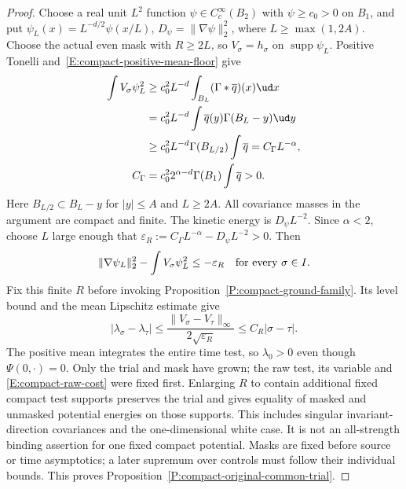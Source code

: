 \begin{proof}
  Choose a real unit $L^2$ function $\psi\in C_c^\infty(B_2)$
  with $\psi\ge c_0>0$ on $B_1$, and put
  $\psi_L(x)=L^{-d/2}\psi(x/L)$, $D_\psi=\|\nabla\psi\|_2^2$,
  where $L\ge\max(1,2A)$. Choose the actual even mask with
  $R\ge2L$, so $V_\sigma=h_\sigma$ on $\operatorname{supp}\psi_L$.
  Positive Tonelli and~\eqref{E:compact-positive-mean-floor} give
  \begin{align}
    \int V_\sigma\psi_L^2
    &\ge c_0^2L^{-d}\int_{B_L}(\Gamma*\overline q)(x)\ud x\nonumber\\
    &=c_0^2L^{-d}\int\overline q(y)\Gamma(B_L-y)\ud y\nonumber\\
    &\ge c_0^2L^{-d}\Gamma(B_{L/2})\int\overline q
    =C_\Gamma L^{-\alpha},\label{E:compact-trial-potential}\\
    C_\Gamma&=c_0^22^{\alpha-d}\Gamma(B_1)\int\overline q>0.\nonumber
  \end{align}
  Here $B_{L/2}\subset B_L-y$ for $|y|\le A$ and $L\ge2A$.
  All covariance masses in the argument are compact and finite.
  The kinetic energy is $D_\psi L^{-2}$. Since $\alpha<2$,
  choose $L$ large enough that
  $\varepsilon_R:=C_\Gamma L^{-\alpha}-D_\psi L^{-2}>0$.
  Then
  \[
    \|\nabla\psi_L\|_2^2-\int V_\sigma\psi_L^2
    \le-\varepsilon_R\quad\hbox{for every }\sigma\in I.
  \]
  Fix this finite $R$ before invoking
  Proposition~\ref{P:compact-ground-family}.
  Its level bound and the mean Lipschitz estimate give
  \[
    |\lambda_\sigma-\lambda_\tau|
    \le\frac{\|V_\sigma-V_\tau\|_\infty}{2\sqrt{\varepsilon_R}}
    \le C_R|\sigma-\tau|.
  \]
  The positive mean integrates the entire time test, so
  $\lambda_0>0$ even though $\Psi(0,\cdot)=0$.
  Only the trial and mask have grown; the raw test, its variable and
  \eqref{E:compact-raw-cost} were fixed first.
  Enlarging $R$ to contain additional fixed compact test supports
  preserves the trial and gives equality of masked and unmasked
  potential energies on those supports. This includes singular
  invariant-direction covariances and the one-dimensional white case.
  It is not an all-strength binding assertion for one fixed compact
  potential. Masks are fixed before source or time asymptotics;
  a later supremum over controls must follow their individual bounds.
  This proves Proposition~\ref{P:compact-original-common-trial}.
\end{proof}
